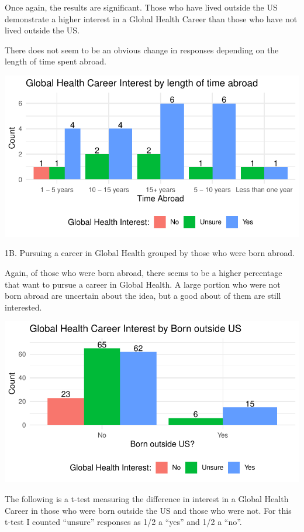 \documentclass[
  letterpaper,
  DIV=11,
  numbers=noendperiod]{scrartcl}
\begin{document}
Once again, the results are significant. Those who have lived outside
the US demonstrate a higher interest in a Global Health Career than
those who have not lived outside the US.

\newpage

There does not seem to be an obvious change in responses depending on
the length of time spent abroad.

\includegraphics{GlobalHealthQuartoHC_files/figure-pdf/unnamed-chunk-17-1.pdf}

\newpage

1B. Pursuing a career in Global Health grouped by those who were born
abroad.

Again, of those who were born abroad, there seems to be a higher
percentage that want to pursue a career in Global Health. A large
portion who were not born abroad are uncertain about the idea, but a
good about of them are still interested.

\includegraphics{GlobalHealthQuartoHC_files/figure-pdf/unnamed-chunk-18-1.pdf}

\newpage

The following is a t-test measuring the difference in interest in a
Global Health Career in those who were born outside the US and those who
were not. For this t-test I counted ``unsure'' responses as 1/2 a
``yes'' and 1/2 a ``no''.
\end{document}
